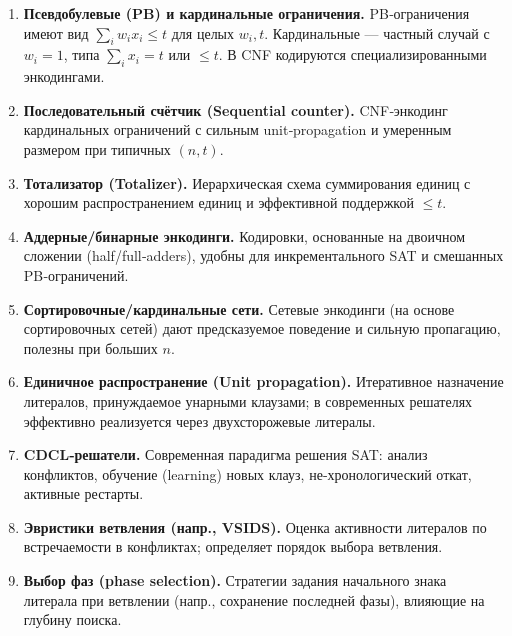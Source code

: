 \begin{enumerate}
\item \label{defsat:pb}
\textbf{Псевдобулевые (PB) и кардинальные ограничения.}
PB‑ограничения имеют вид \(\sum_i w_i x_i \le t\) для целых \(w_i,t\).
Кардинальные — частный случай с \(w_i=1\), типа \(\sum_i x_i = t\) или \(\le t\).
В CNF кодируются специализированными энкодингами.~\cite{EenSorensson2006,HandbookSAT2021}

\item \label{defsat:seq}
\textbf{Последовательный счётчик (Sequential counter).}
CNF‑энкодинг кардинальных ограничений с сильным unit‑propagation и умеренным размером при типичных \((n,t)\).~\cite{Sinz2005}

\item \label{defsat:totalizer}
\textbf{Тотализатор (Totalizer).}
Иерархическая схема суммирования единиц с хорошим распространением единиц и эффективной поддержкой \(\le t\).~\cite{BailleuxBoufkhad2003}

\item \label{defsat:adder}
\textbf{Аддерные/бинарные энкодинги.}
Кодировки, основанные на двоичном сложении (half/full‑adders), удобны для инкрементального SAT и смешанных PB‑ограничений.~\cite{EenSorensson2006}

\item \label{defsat:cardnet}
\textbf{Сортировочные/кардинальные сети.}
Сетевые энкодинги (на основе сортировочных сетей) дают предсказуемое поведение и сильную пропагацию, полезны при больших \(n\).~\cite{Asin2009}

\item \label{defsat:up}
\textbf{Единичное распространение (Unit propagation).}
Итеративное назначение литералов, принуждаемое унарными клаузами; в современных решателях эффективно реализуется через двухсторожевые литералы.~\cite{Moskewicz2001,HandbookSAT2021}

\item \label{defsat:cdcl}
\textbf{CDCL‑решатели.}
Современная парадигма решения SAT: анализ конфликтов, обучение (learning) новых клауз, не‑хронологический откат, активные рестарты.~\cite{MarquesSilvaSakallah1999,HandbookSAT2021}

\item \label{defsat:vsids}
\textbf{Эвристики ветвления (напр., VSIDS).}
Оценка активности литералов по встречаемости в конфликтах; определяет порядок выбора ветвления.~\cite{Moskewicz2001}

\item \label{defsat:phase}
\textbf{Выбор фаз (phase selection).}
Стратегии задания начального знака литерала при ветвлении (напр., сохранение последней фазы), влияющие на глубину поиска.~\cite{EenSorensson2003}


\end{enumerate}
